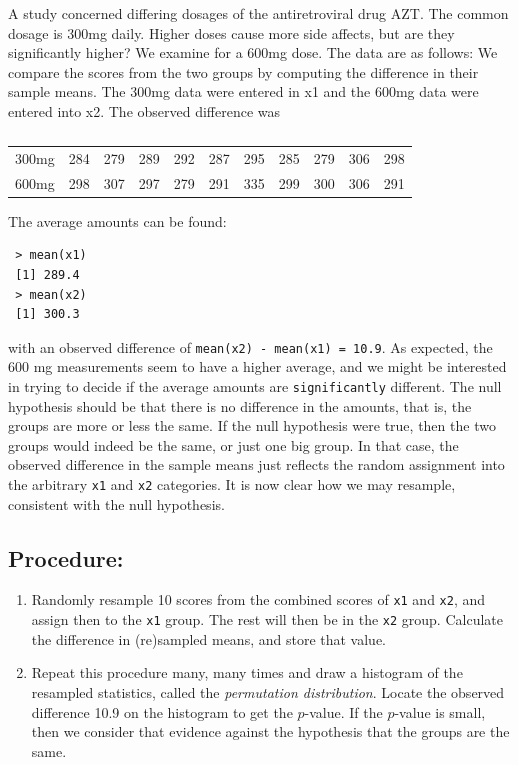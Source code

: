 \documentclass[captions=tableheading]{scrbook}
\begin{document}
\begin{example}
A study concerned differing dosages of the antiretroviral drug AZT. The common dosage is 300mg daily. Higher doses cause more side affects, but are they significantly higher? We examine for a 600mg dose. The data are as follows: We compare the scores from the two groups by computing the difference in their sample means. The 300mg data were entered in x1 and the 600mg data were entered into x2. The observed difference was
\begin{table}[htb]
\caption{} \label{exa-percentile-interval-median-first}
\begin{center}
\begin{tabular}{lrrrrrrrrrr}
 300mg  &  284  &  279  &  289  &  292  &  287  &  295  &  285  &  279  &  306  &  298  \\
 600mg  &  298  &  307  &  297  &  279  &  291  &  335  &  299  &  300  &  306  &  291  \\
\end{tabular}
\end{center}
\end{table}

The average amounts can be found:
\begin{verbatim}
 > mean(x1)
 [1] 289.4
 > mean(x2)
 [1] 300.3
\end{verbatim}

with an observed difference of \texttt{mean(x2) - mean(x1) = 10.9}. As expected, the 600 mg measurements seem to have a higher average, and we might be interested in trying to decide if the average amounts are \texttt{significantly} different. The null hypothesis should be that there is no difference in the amounts, that is, the groups are more or less the same. If the null hypothesis were true, then the two groups would indeed be the same, or just one big group. In that case, the observed difference in the sample means just reflects the random assignment into the arbitrary \texttt{x1} and \texttt{x2} categories. It is now clear how we may resample, consistent with the null hypothesis.
\subsection{Procedure:}
\label{sec-13-4-1}


\begin{enumerate}
\item Randomly resample 10 scores from the combined scores of \texttt{x1} and \texttt{x2}, and assign then to the \texttt{x1} group. The rest will then be in the \texttt{x2} group. Calculate the difference in (re)sampled means, and store that value.
\item Repeat this procedure many, many times and draw a histogram of the resampled statistics, called the \emph{permutation distribution}. Locate the observed difference 10.9 on the histogram to get the \(p\)-value. If the \(p\)-value is small, then we consider that evidence against the hypothesis that the groups are the same.
\end{enumerate}


\end{example}
\end{document}
